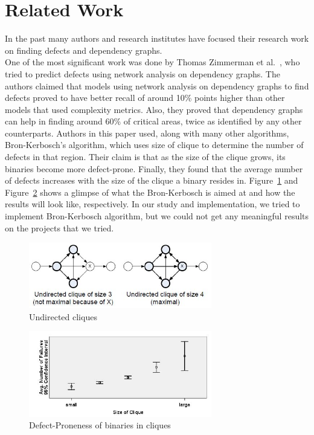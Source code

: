 
\section{Related Work}
\label{sec:related}

In the past many authors and research institutes have focused their research work on finding defects and dependency graphs. \\

One of the most significant work was done by Thomas Zimmerman et al.~\cite{zimmermann2008predicting}, who tried to predict defects using network analysis on dependency graphs. The authors claimed that models using network analysis on dependency graphs to find defects proved to have better recall of around 10\% points higher than other models that used complexity metrics. Also, they proved that dependency graphs can help in finding around 60\% of critical areas, twice as identified by any other counterparts. Authors in this paper used, along with many other algorithms, Bron-Kerbosch's algorithm, which uses size of clique to determine the number of defects in that region. Their claim is that as the size of the clique grows, its binaries become more defect-prone. Finally, they found that the average number of defects increases with the size of the clique a binary resides in. Figure~\ref{fig:relatedwork} and Figure~\ref{fig:relatedwork1} shows a glimpse of what the Bron-Kerbosch is aimed at and how the results will look like, respectively. In our study and implementation, we tried to implement Bron-Kerbosch algorithm, but we could not get any meaningful results on the projects that we tried.

\begin{figure}[h!]
\includegraphics[width=8cm]{relatedwork}
\caption{Undirected cliques}
\label{fig:relatedwork}
\end{figure}

\begin{figure}[h!]
\includegraphics[width=8cm]{relatedwork1}
\caption{Defect-Proneness of binaries in cliques}
\label{fig:relatedwork1}
\end{figure}

